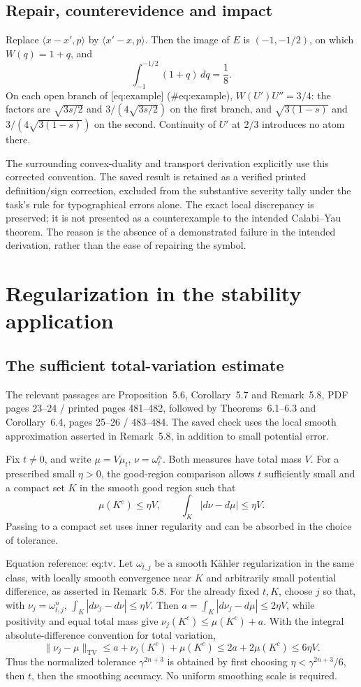 \documentclass[10pt]{article}
\begin{document}
\subsection*{Repair, counterevidence and impact}
Replace \(\langle x-x',p\rangle\) by \(\langle x'-x,p\rangle\). Then the image of \(E\) is \((-1,-1/2)\), on which \(W(q)=1+q\), and \[\int_{-1}^{-1/2}(1+q)\,dq=\frac18.\] On each open branch of [eq:example] (\#eq:example), \(W(U')U''=3/4\): the factors are \(\sqrt{3s/2}\) and \(3/(4\sqrt{3s/2})\) on the first branch, and \(\sqrt{3(1-s)}\) and \(3/(4\sqrt{3(1-s)})\) on the second. Continuity of \(U'\) at \(2/3\) introduces no atom there.\par
The surrounding convex-duality and transport derivation explicitly use this corrected convention. The saved result is retained as a verified printed definition/sign correction, excluded from the substantive severity tally under the task’s rule for typographical errors alone. The exact local discrepancy is preserved; it is not presented as a counterexample to the intended Calabi–Yau theorem. The reason is the absence of a demonstrated failure in the intended derivation, rather than the ease of repairing the symbol.\par
\section*{Regularization in the stability application}
\subsection*{The sufficient total-variation estimate}
The relevant passages are Proposition 5.6, Corollary 5.7 and Remark 5.8, PDF pages 23–24 / printed pages 481–482, followed by Theorems 6.1–6.3 and Corollary 6.4, pages 25–26 / 483–484. The saved check uses the local smooth approximation asserted in Remark 5.8, in addition to small potential error.\par
Fix \(t\ne0\), and write \(\mu=V\mu_t\), \(\nu=\omega_t^n\). Both measures have total mass \(V\). For a prescribed small \(\eta>0\), the good-region comparison allows \(t\) sufficiently small and a compact set \(K\) in the smooth good region such that \[\mu(K^c)\leq\eta V,\qquad
 \int_K|d\nu-d\mu|\leq\eta V .\] Passing to a compact set uses inner regularity and can be absorbed in the choice of tolerance.\par
Equation reference: eq:tv. Let \(\omega_{t,j}\) be a smooth Kähler regularization in the same class, with locally smooth convergence near \(K\) and arbitrarily small potential difference, as asserted in Remark 5.8. For the already fixed \(t,K\), choose \(j\) so that, with \(\nu_j=\omega_{t,j}^n\), \(\int_K|d\nu_j-d\nu|\leq\eta V\). Then \(a=\int_K|d\nu_j-d\mu|\leq2\eta V\), while positivity and equal total mass give \(\nu_j(K^c)\leq\mu(K^c)+a\). With the integral absolute-difference convention for total variation, \[
 \|\nu_j-\mu\|_{\mathrm{TV}}
 \leq a+\nu_j(K^c)+\mu(K^c)
 \leq2a+2\mu(K^c)\leq6\eta V .\] Thus the normalized tolerance \(\gamma^{2n+3}\) is obtained by first choosing \(\eta<\gamma^{2n+3}/6\), then \(t\), then the smoothing accuracy. No uniform smoothing scale is required.\par
\end{document}
